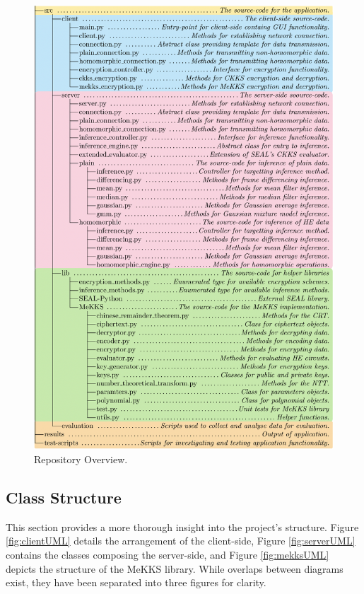 \begin{figure}[htp]     
    \includegraphics[scale=0.97]{figures/repositoryOverview}
    \caption[Repository Overview]{Repository Overview.}
    \label{fig:filetree}
\end{figure}
\setlength{\leftskip}{0cm}
\subsection{Class Structure}
\setlength{\leftskip}{0.5cm}
\indent \indent
This section provides a more thorough insight into the project's structure. Figure \ref{fig:clientUML} details the arrangement of the client-side, Figure \ref{fig:serverUML} contains the classes composing the server-side, and Figure \ref{fig:mekksUML} depicts the structure of the MeKKS library. While overlaps between diagrams exist, they have been separated into three figures for clarity.

